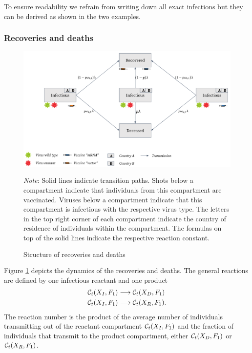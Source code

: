 To ensure readability we refrain from writing down all exact infections but they can be derived as shown in the two examples.

\subsubsection{Recoveries and deaths}
\begin{figure}[h!]
\centering
\includegraphics[scale=0.3]{images/overview_recovery.png}\\
\begin{flushleft}
\scriptsize{\textit{Note}: Solid lines indicate transition paths. Shots below a compartment indicate that individuals from this compartment are vaccinated. Viruses below a compartment indicate that this compartment is infectious with the respective virus type. The letters in the top right corner of each compartment indicate the country of residence of individuals within the compartment. The formulas on top of the solid lines indicate the respective reaction constant.}
\end{flushleft}
\caption{Structure of recoveries and deaths}
\label{fig:model_recoveries}
\end{figure}
Figure \ref{fig:model_recoveries} depicts the dynamics of the recoveries and deaths. The general reactions are defined by one infectious reactant and one product
\begin{align}
\label{eq:recovery}
    \mathcal{C}_t(X_I, F_1) & \longrightarrow  \mathcal{C}_t(X_D, F_1) \\
    \mathcal{C}_t(X_I, F_1) & \longrightarrow  \mathcal{C}_t(X_R, F_1). \notag
\end{align}
The reaction number is the product of the average number of individuals transmitting out of the reactant compartment $\mathcal{C}_t(X_I, F_1)$ and the fraction of individuals that transmit to the product compartment, either $\mathcal{C}_t(X_D, F_1)$ or $\mathcal{C}_t(X_R, F_1)$. \\

